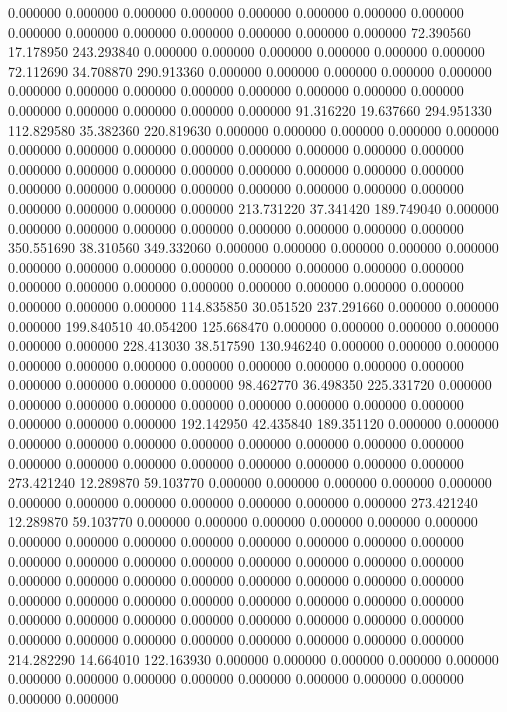 0.000000 0.000000 0.000000
0.000000 0.000000 0.000000
0.000000 0.000000 0.000000
0.000000 0.000000 0.000000
0.000000 0.000000 0.000000
72.390560 17.178950 243.293840
0.000000 0.000000 0.000000
0.000000 0.000000 0.000000
72.112690 34.708870 290.913360
0.000000 0.000000 0.000000
0.000000 0.000000 0.000000
0.000000 0.000000 0.000000
0.000000 0.000000 0.000000
0.000000 0.000000 0.000000
0.000000 0.000000 0.000000
91.316220 19.637660 294.951330
112.829580 35.382360 220.819630
0.000000 0.000000 0.000000
0.000000 0.000000 0.000000
0.000000 0.000000 0.000000
0.000000 0.000000 0.000000
0.000000 0.000000 0.000000
0.000000 0.000000 0.000000
0.000000 0.000000 0.000000
0.000000 0.000000 0.000000
0.000000 0.000000 0.000000
0.000000 0.000000 0.000000
0.000000 0.000000 0.000000
213.731220 37.341420 189.749040
0.000000 0.000000 0.000000
0.000000 0.000000 0.000000
0.000000 0.000000 0.000000
350.551690 38.310560 349.332060
0.000000 0.000000 0.000000
0.000000 0.000000 0.000000
0.000000 0.000000 0.000000
0.000000 0.000000 0.000000
0.000000 0.000000 0.000000
0.000000 0.000000 0.000000
0.000000 0.000000 0.000000
0.000000 0.000000 0.000000
114.835850 30.051520 237.291660
0.000000 0.000000 0.000000
199.840510 40.054200 125.668470
0.000000 0.000000 0.000000
0.000000 0.000000 0.000000
228.413030 38.517590 130.946240
0.000000 0.000000 0.000000
0.000000 0.000000 0.000000
0.000000 0.000000 0.000000
0.000000 0.000000 0.000000
0.000000 0.000000 0.000000
98.462770 36.498350 225.331720
0.000000 0.000000 0.000000
0.000000 0.000000 0.000000
0.000000 0.000000 0.000000
0.000000 0.000000 0.000000
192.142950 42.435840 189.351120
0.000000 0.000000 0.000000
0.000000 0.000000 0.000000
0.000000 0.000000 0.000000
0.000000 0.000000 0.000000
0.000000 0.000000 0.000000
0.000000 0.000000 0.000000
273.421240 12.289870 59.103770
0.000000 0.000000 0.000000
0.000000 0.000000 0.000000
0.000000 0.000000 0.000000
0.000000 0.000000 0.000000
273.421240 12.289870 59.103770
0.000000 0.000000 0.000000
0.000000 0.000000 0.000000
0.000000 0.000000 0.000000
0.000000 0.000000 0.000000
0.000000 0.000000 0.000000
0.000000 0.000000 0.000000
0.000000 0.000000 0.000000
0.000000 0.000000 0.000000
0.000000 0.000000 0.000000
0.000000 0.000000 0.000000
0.000000 0.000000 0.000000
0.000000 0.000000 0.000000
0.000000 0.000000 0.000000
0.000000 0.000000 0.000000
0.000000 0.000000 0.000000
0.000000 0.000000 0.000000
0.000000 0.000000 0.000000
0.000000 0.000000 0.000000
214.282290 14.664010 122.163930
0.000000 0.000000 0.000000
0.000000 0.000000 0.000000
0.000000 0.000000 0.000000
0.000000 0.000000 0.000000
0.000000 0.000000 0.000000
